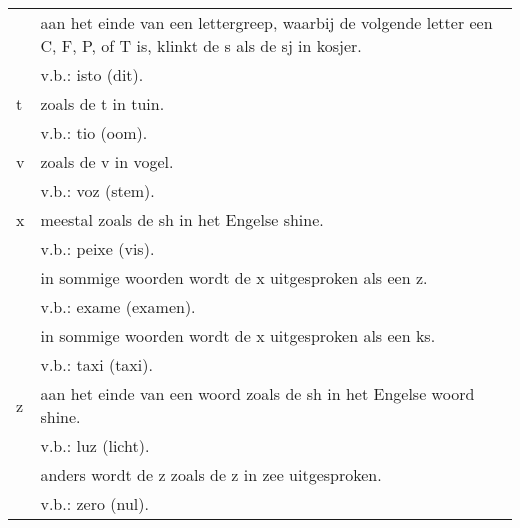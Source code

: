 \begin{longtable}{p{} p{}}
& aan het einde van een lettergreep, waarbij de volgende letter een C, F, P, of T is, klinkt de s als de sj in kosjer.\\
 & v.b.: isto (dit).\\
t & zoals de t in tuin.\\
 & v.b.: tio (oom).\\
v & zoals de v in vogel.\\
 & v.b.: voz (stem).\\
x & meestal zoals de sh in het Engelse shine.\\
 & v.b.: peixe (vis).\\
& in sommige woorden wordt de x uitgesproken als een z.\\
 & v.b.: exame (examen).\\
& in sommige woorden wordt de x uitgesproken als een ks.\\
 & v.b.: taxi (taxi).\\
z & aan het einde van een woord zoals de sh in het Engelse woord shine.\\
 & v.b.: luz (licht).\\
& anders wordt de z zoals de z in zee uitgesproken.\\
 & v.b.: zero (nul).
\end{longtable}

